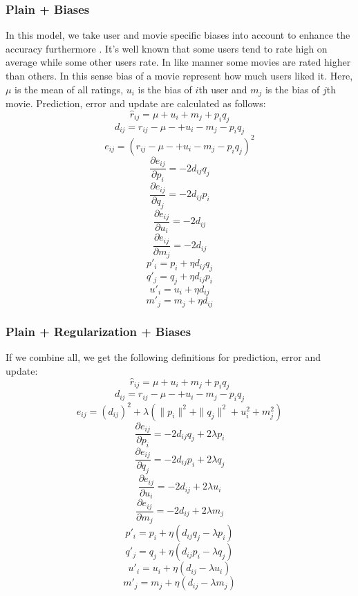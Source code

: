 \documentclass[11pt]{article}
\begin{document}
\begin{multicols}{2}
		\subsubsection{Plain + Biases}		
			In this model, we take user and movie specific biases into account to enhance the accuracy furthermore \cite{koren}. It's well known that some users tend to rate high on average while some other users rate. In like manner some movies are rated higher than others. In this sense bias of a movie represent how much users liked it. Here, $\mu$ is the mean of all ratings, $u_i$ is the bias of $i$th user and $m_j$ is the bias of $j$th movie. Prediction, error and update are calculated as follows:						
			$$\hat{r}_{ij} = \mu + u_i + m_j + p_i q_j$$ 
			$$d_{ij} = r_{ij} - \mu-+ u_i - m_j - p_i q_j$$
			$$e_{ij} = (r_{ij} - \mu-+ u_i - m_j - p_i q_j)^2$$
			$$\frac{\partial e_{ij}}{\partial p_i} = -2 d_{ij} q_j$$
			$$\frac{\partial e_{ij}}{\partial q_j} = -2 d_{ij} p_i$$	
			$$\frac{\partial e_{ij}}{\partial u_i} = -2 d_{ij} $$
			$$\frac{\partial e_{ij}}{\partial m_j} = -2 d_{ij} $$	
			$$p'_i = p_i + \eta d_{ij} q_j$$			
			$$q'_j = q_j + \eta d_{ij} p_i$$				
			$$u'_i = u_i + \eta d_{ij}$$			
			$$m'_j = m_j + \eta d_{ij}$$				
		\subsubsection{Plain + Regularization + Biases}		
			If we combine all, we get the following definitions for prediction, error and update:
			$$\hat{r}_{ij} = \mu + u_i + m_j + p_i q_j$$ 
			$$d_{ij} = r_{ij} - \mu-+ u_i - m_j - p_i q_j$$
			$$e_{ij} = (d_{ij})^2 + \lambda (\|p_i\|^2 + \|q_j\|^2 + u^2_i + m^2_j)$$
			$$\frac{\partial e_{ij}}{\partial p_i} = -2 d_{ij} q_j + 2 \lambda p_i$$
			$$\frac{\partial e_{ij}}{\partial q_j} = -2 d_{ij} p_i + 2 \lambda q_j$$	
			$$\frac{\partial e_{ij}}{\partial u_i} = -2 d_{ij} + 2 \lambda u_i$$
			$$\frac{\partial e_{ij}}{\partial m_j} = -2 d_{ij} + 2 \lambda m_j$$	
			$$p'_i = p_i + \eta (d_{ij} q_j - \lambda p_i)$$			
			$$q'_j = q_j + \eta (d_{ij} p_i - \lambda q_j)$$			
			$$u'_i = u_i + \eta (d_{ij}  - \lambda u_i)$$			
			$$m'_j = m_j + \eta (d_{ij}  - \lambda m_j)$$			

\end{multicols}
\end{document}
